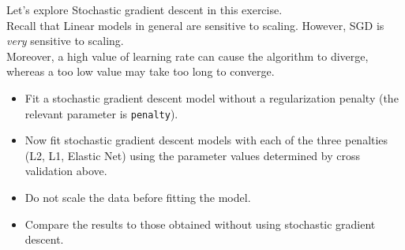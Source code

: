 \documentclass[11pt]{article}
\providecommand{\tightlist}{%
      \setlength{\itemsep}{0pt}\setlength{\parskip}{0pt}}
\begin{document}
Let's explore Stochastic gradient descent in this exercise.\\
Recall that Linear models in general are sensitive to scaling. However,
SGD is \emph{very} sensitive to scaling.\\
Moreover, a high value of learning rate can cause the algorithm to
diverge, whereas a too low value may take too long to converge.

\begin{itemize}
\tightlist
\item
  Fit a stochastic gradient descent model without a regularization
  penalty (the relevant parameter is \texttt{penalty}).
\item
  Now fit stochastic gradient descent models with each of the three
  penalties (L2, L1, Elastic Net) using the parameter values determined
  by cross validation above.
\item
  Do not scale the data before fitting the model.\\
\item
  Compare the results to those obtained without using stochastic
  gradient descent.
\end{itemize}
\end{document}

